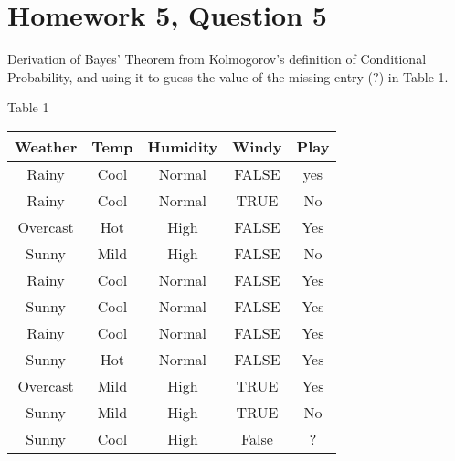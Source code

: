 \documentclass{article}
\begin{document}
\maketitle

\newcommand{\A}{x_1 \, and \, \dots \, x_n}

\makeatletter
\renewcommand{\@seccntformat}[1]{}
\makeatother

\section{Homework 5, Question 5}\label{abstract}

	 Derivation of Bayes' Theorem from Kolmogorov's definition of Conditional Probability, and using it to guess the value of the missing entry ($?$) in Table 1.
	 

% 
%

\begin{center} Table 1 \end{center}

\begin{center}
 \begin{tabular}{||c c c c c||} 
 \hline
 Weather & Temp & Humidity & Windy & Play \\ [0.5ex] 
 \hline\hline
 Rainy&Cool&Normal&FALSE&yes\\
 \hline
 Rainy&Cool&Normal&TRUE&No\\
 \hline
 Overcast&Hot&High&FALSE&Yes\\
 \hline
 Sunny&Mild&High&FALSE&No\\
 \hline
 Rainy&Cool&Normal&FALSE&Yes\\
 \hline
 Sunny&Cool&Normal&FALSE&Yes\\
 \hline
 Rainy&Cool&Normal&FALSE&Yes\\
 \hline
 Sunny&Hot&Normal&FALSE&Yes\\
 \hline
 Overcast&Mild&High&TRUE&Yes\\
 \hline
 Sunny&Mild&High&TRUE&No\\
 \hline
 Sunny & Cool& High & False	& ? \\ [1ex] 
 \hline
\end{tabular}
\end{center}
\end{document}
